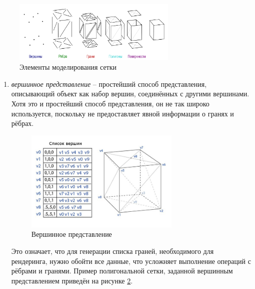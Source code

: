 \begin{figure}[h] 
	\centering
	\includegraphics[width=0.7\textwidth]{images/polygonal-models-example.png}
	\caption{Элементы моделирования сетки} 
	\label{fig:polygonal-models-example} 
\end{figure}

\begin{enumerate}
	\item \textit{вершинное представление} -- простейший способ представления, описывающий объект как набор вершин, соединённых с другими вершинами. Хотя это и простейший способ представления, он не так широко используется, поскольку не предоставляет явной информации о гранях и рёбрах. 
	\begin{figure}[h] 
		\centering
		\includegraphics[width=0.7\textwidth]{images/vertex-list.png}
		\caption{Вершинное представление} 
		\label{fig:vertex-list} 
	\end{figure}
	Это означает, что для генерации списка граней, необходимого для рендеринга, нужно обойти все данные, что усложняет выполнение операций с рёбрами и гранями. Пример полигональной сетки, заданной вершинным представлением приведён на рисунке \ref{fig:vertex-list}.
	

\end{enumerate}
